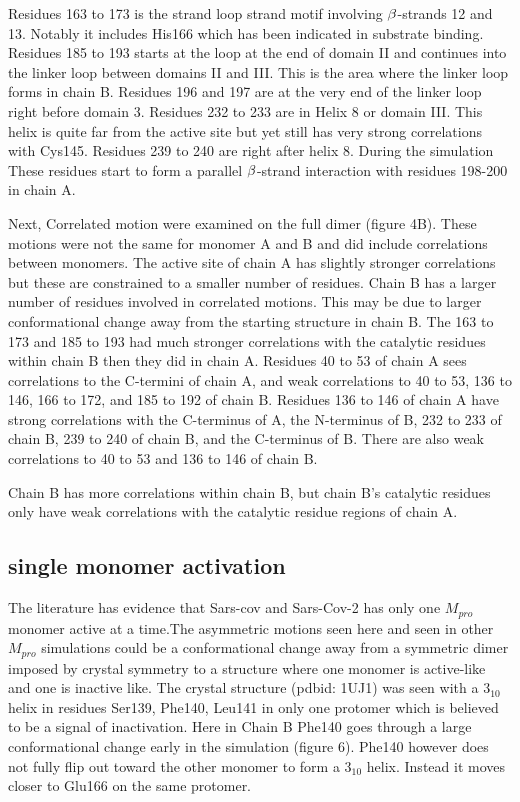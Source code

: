 \documentclass{biophys-new}
\begin{document}
Residues 163 to 173 is the strand loop strand motif involving $\MakeUppercase{\beta}$-strands 12 and 13. Notably it includes His166 which has been indicated in substrate binding. Residues 185 to 193 starts at the loop at the end of domain II and continues into the linker loop between domains II and III. This is the area where the linker loop forms in chain B. Residues 196 and 197 are at the very end of the linker loop right before domain 3. Residues 232 to 233 are in Helix 8 or domain III. This helix is quite far from the active site but yet still has very strong correlations with Cys145. Residues 239 to 240 are right after helix 8. During the simulation These residues start to form a parallel $\MakeUppercase{\beta}$-strand interaction with residues 198-200 in chain A.

Next, Correlated motion were examined on the full dimer (figure 4B). These motions were not the same for monomer A and B and did include correlations between monomers. The active site of chain A has slightly stronger correlations but these are constrained to a smaller number of residues. Chain B has a larger number of residues involved in correlated motions. This may be due to larger conformational change away from the starting structure in chain B. The 163 to 173 and 185 to 193 had much stronger correlations with the catalytic residues within chain B then they did in chain A. Residues 40 to 53 of chain A sees correlations to the C-termini of chain A, and weak correlations to 40 to 53, 136 to 146, 166 to 172, and 185 to 192 of chain B. Residues 136 to 146 of chain A have strong correlations with the C-terminus of A, the N-terminus of B, 232 to 233 of chain B, 239 to 240 of chain B, and the C-terminus of B. There are also weak correlations to 40 to 53 and 136 to 146 of chain B.

Chain B has more correlations within chain B, but chain B's catalytic residues only have weak correlations with the catalytic residue regions of chain A. 

\subsection*{single monomer activation}

The literature has evidence that Sars-cov\cite{chen2006only} and Sars-Cov-2 has only one $M_{pro}$ monomer active at a time.The asymmetric motions seen here and seen in other $M_{pro}$ simulations\cite{inizan2021high} could be a conformational change away from a symmetric dimer imposed by crystal symmetry to a structure where one monomer is active-like and one is inactive like. The crystal structure (pdbid: 1UJ1) was seen with a $3_{10}$ helix in residues Ser139, Phe140, Leu141 in only one protomer which is believed to be a signal of inactivation. Here in Chain B Phe140 goes through a large conformational change early in the simulation (figure 6). Phe140 however does not fully flip out toward the other monomer to form a $3_{10}$ helix. Instead it moves closer to Glu166 on the same protomer.
\end{document}
